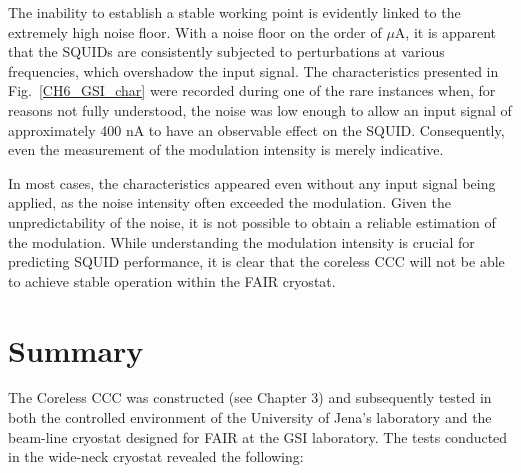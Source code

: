 \documentclass[12pt,a4paper]{report}
\begin{document}
	The inability to establish a stable working point is evidently linked to the extremely high noise floor. With a noise floor on the order of $\mu$A, it is apparent that the SQUIDs are consistently subjected to perturbations at various frequencies, which overshadow the input signal. The characteristics presented in Fig.~\ref{CH6_GSI_char} were recorded during one of the rare instances when, for reasons not fully understood, the noise was low enough to allow an input signal of approximately 400 nA to have an observable effect on the SQUID. Consequently, even the measurement of the modulation intensity is merely indicative. 
	
	In most cases, the characteristics appeared even without any input signal being applied, as the noise intensity often exceeded the modulation. Given the unpredictability of the noise, it is not possible to obtain a reliable estimation of the modulation. While understanding the modulation intensity is crucial for predicting SQUID performance, it is clear that the coreless CCC will not be able to achieve stable operation within the FAIR cryostat.
	
	\section{Summary}
	The Coreless CCC was constructed (see Chapter 3) and subsequently tested in both the controlled environment of the University of Jena's laboratory and the beam-line cryostat designed for FAIR at the GSI laboratory. The tests conducted in the wide-neck cryostat revealed the following:
	
\end{document}

